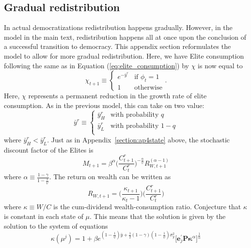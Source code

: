 \subsection{Gradual redistribution}\label{section:gradual_redist}

In actual democratizations redistribution happens gradually. However, in the model in the main text, redistribution happens all at once upon the conclusion of a successful transition to democracy. This appendix section reformulates the model to allow for more gradual redistribution. Here, we have Elite consumption following the same as in Equation (\ref{eq:elite_consumption}) by $\chi$ is now equal to
\begin{equation}
\chi_{t+1} \equiv \begin{cases} 
e^{- \bar{y}^r} & \textrm{if }\phi_{t}=1 \\
1 & \textrm{otherwise}
\end{cases}.
\end{equation}
Here, $\chi$ represents a permanent reduction in the growth rate of elite consumption. As in the previous model, this can take on two value:
\begin{equation}
\bar{y}^r \equiv \begin{cases} 
 \bar{y}^r_H & \textrm{with probability }q \\
 \bar{y}^r_L & \textrm{with probability }1-q \\
\end{cases} 
\end{equation}
where $\bar{y}^r_H < \bar{y}^r_L$. Just as in Appendix~\ref{section:ap4state} above, the stochastic discount factor of the Elites is
\[
M_{t+1}=\beta^{\alpha}\bigg(\frac{C_{t+1}^r}{C_{t}^r}\bigg)^{-\frac{\alpha}{\psi}}R_{W,t+1}^{(\alpha-1)}
\]
where $\alpha \equiv \frac{1-\gamma}{1-\frac{1}{\psi}}$. The return on wealth can be written as
\begin{equation}
R_{W,t+1} = \bigg(\frac{\kappa_{t+1}}{\kappa_t - 1}\bigg)\bigg(\frac{C_{t+1}^r}{C_{t}^r}\bigg)
\end{equation}
where $\kappa \equiv W/C$ is the cum-dividend wealth-consumption ratio. Conjecture that $\kappa$ is constant in each state of $\mu$.  This means that the solution is given by the solution to the system of equations
\begin{equation}
\kappa(\mu^j)=1+\beta e^{(1-\frac{1}{\psi})\bar{y}+\frac{1}{2}(1-\gamma)(1-\frac{1}{\psi})\sigma_y^2} \bigg[\mathbf{e}_j^\prime \mathbf{P}\boldsymbol\kappa^{\alpha}\bigg]^{\frac{1}{\alpha}}
\end{equation}
